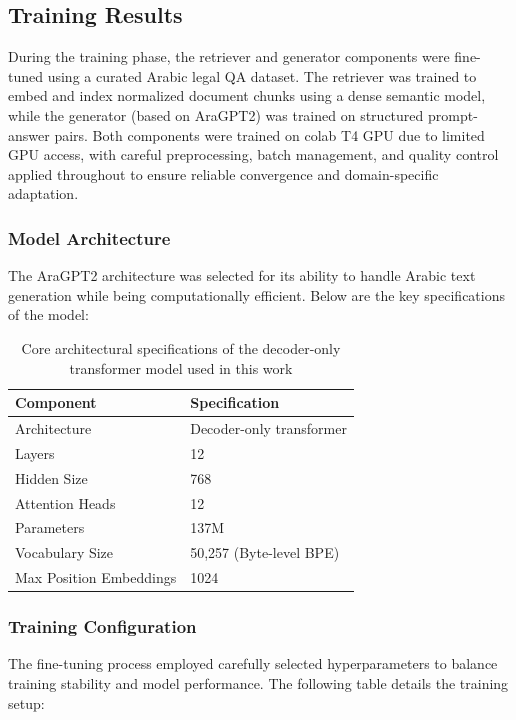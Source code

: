 \subsection{Training Results}
During the training phase, the retriever and generator components were fine-tuned using a curated Arabic legal QA dataset. The retriever was trained to embed and index normalized document chunks using a dense semantic model, while the generator (based on AraGPT2) was trained on structured prompt-answer pairs. Both components were trained on colab T4 GPU due to limited GPU access, with careful preprocessing, batch management, and quality control applied throughout to ensure reliable convergence and domain-specific adaptation.


  	\subsubsection{Model Architecture}
The AraGPT2 architecture was selected for its ability to handle Arabic text generation while being computationally efficient. Below are the key specifications of the model:

\begin{table}[h]
	\centering
	
	\begin{tabular}{|l|l|}
		\hline
		\textbf{Component} & \textbf{Specification} \\ \hline
		Architecture & Decoder-only transformer \\ \hline
		Layers & 12 \\ \hline
		Hidden Size & 768 \\ \hline
		Attention Heads & 12 \\ \hline
		Parameters & 137M \\ \hline
		Vocabulary Size & 50,257 (Byte-level BPE) \\ \hline
		Max Position Embeddings & 1024 \\ \hline
	\end{tabular}
	\caption{ Core architectural specifications of the decoder-only transformer model used in this work}
\end{table}

	\subsubsection{Training Configuration}
The fine-tuning process employed carefully selected hyperparameters to balance training stability and model performance. The following table details the training setup:

